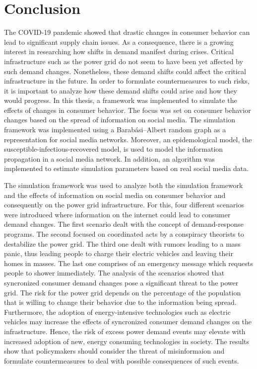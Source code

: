 \chapter{Conclusion}
\label{conclusion}

The COVID-19 pandemic showed that drastic changes in 
consumer behavior can lead to significant supply chain issues.
As a consequence, there is a growing interest in researching 
how shifts in demand manifest during crises. 
Critical infrastructure such as the power grid
do not seem to have been yet affected by such demand changes.
Nonetheless, these demand shifts could affect the critical 
infrastructure in the future. In order to 
formulate countermeasures to such risks, it is 
important to analyze how these demand shifts could 
arise and how they would progress. In this thesis,
a framework was implemented to simulate the effects of 
changes in consumer behavior. The focus was set on
consumer behavior changes based on the spread
of information on social media. 
The simulation framework was implemented using 
a Barabási–Albert random graph as a representation for social 
media networks. Moreover, an epidemological model, 
the susceptible-infectious-recovered model, is used to model 
the information propagation in a social media network.
In addition, an algorithm was implemented to estimate 
simulation parameters based on real social media 
data. 

The simulation framework was used to analyze both 
the simulation framework and the effects of information 
on social media on consumer behavior and 
consequently on the power grid infrastructure.
For this, four different 
scenarios were introduced where information
on the internet could lead to consumer demand changes. 
The first scenario dealt with the concept of 
demand-response programs. The second focused on 
coordinated acts by a conspiracy theorists to destabilize 
the power grid. The third one dealt with rumors leading 
to a mass panic, thus leading people to charge their 
electric vehicles and leaving their homes in masses.
The last one comprises of an emergency message 
which requests people to shower immediately.
The analysis of the scenarios 
showed that syncronized consumer
demand changes pose a significant threat to the power
grid. The risk for the power grid depends on the percentage
of the population that is willing to change their behavior 
due to the information being spread.
Furthermore, the adoption
of energy-intensive technologies such as 
electric vehicles may increase the 
effects of syncronized consumer demand changes
on the infrastructure. 
Hence, the risk of excess power demand events may
elevate with increased adoption of new, energy consuming 
technologies in society.
The results show that policymakers should consider the
threat of misinformaion and formulate countermeasures
to deal with possible consequences of such events.

